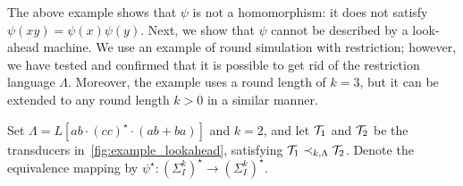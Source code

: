 The above example shows that $\psi$ is not a homomorphism: it does not satisfy $\psi(xy)=\psi(x)\psi(y)$. Next, we show that $\psi$ cannot be described by a look-ahead machine. We use an example of round simulation with restriction; however, we have tested and confirmed that it is possible to get rid of the restriction language $\Lambda$. Moreover, the example uses a round length of $k=3$, but it can be extended to any round length $k>0$ in a similar manner.

\begin{example}
\label{example:lookahead}
Set $\Lambda=L[ab\cdot (cc)^\star\cdot (ab+ba)]$ and $k=2$, and let $\mathcal{T}_1$ and $\mathcal{T}_2$ be the transducers in~\cref{fig:example_lookahead}, satisfying $\mathcal{T}_1\prec_{k,\Lambda} \mathcal{T}_2$. Denote the equivalence mapping by $\psi^\star: (\Sigma_I^k)^\star \rightarrow (\Sigma_I^k)^\star$.


\end{example}
